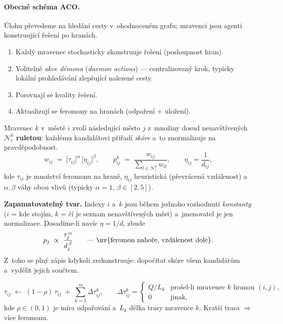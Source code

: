 \documentclass[11pt,a4paper]{article}
\theoremstyle{definition}
\begin{document}
\paragraph{Obecné schéma ACO.} Úlohu převedeme na hledání cesty v~ohodnoceném
grafu; mravenci jsou agenti konstruující řešení po hranách.
\begin{enumerate}
\item Každý mravenec stochasticky zkonstruuje řešení (posloupnost hran).
\item Volitelně \emph{akce démona} (\emph{daemon actions}) --- centralizovaný
  krok, typicky lokální prohledávání zlepšující nalezené cesty.
\item Porovnají se kvality řešení.
\item Aktualizují se feromony na hranách (odpaření + uložení).
\end{enumerate}

\begin{defbox}
Mravenec $k$ v~městě $i$ zvolí následující město $j$ z~množiny dosud
nenavštívených $\mathcal{N}_i^k$ \textbf{ruletou}: každému kandidátovi přiřadí
\emph{skóre} a~to znormalizuje na pravděpodobnost.
\[
w_{ij} \;=\; \big[\tau_{ij}\big]^{\alpha}\,\big[\eta_{ij}\big]^{\beta},
\qquad
p_{ij}^{k} \;=\; \frac{w_{ij}}{\displaystyle\sum_{l \in \mathcal{N}_i^k} w_{il}},
\qquad \eta_{ij} = \frac{1}{d_{ij}},
\]
kde $\tau_{ij}$ je množství feromonu na hraně, $\eta_{ij}$ heuristická
 (převrácená vzdálenost) a~$\alpha, \beta$ váhy obou vlivů
(typicky $\alpha = 1$, $\beta \in [2,5]$).

\textbf{Zapamatovatelný tvar.} Indexy $i$ a~$k$ jsou během jednoho rozhodnutí
\emph{konstanty} ($i$ = kde stojím, $k$ = čí je seznam nenavštívených měst)
a~jmenovatel je jen normalizace. Dosadíme-li navíc $\eta = 1/d$, zbude
\[
p_j \;\propto\; \frac{\tau_j^{\,\alpha}}{d_j^{\,\beta}}
\qquad\text{---\ \uv{feromon nahoře, vzdálenost dole}.}
\]
Z~toho se plný zápis kdykoli zrekonstruuje: dopočítat skóre všem kandidátům
a~vydělit jejich součtem.
\end{defbox}

\begin{defbox}
\[
\tau_{ij} \;\gets\; (1-\rho)\,\tau_{ij} \;+\; \sum_{k=1}^{m} \Delta\tau_{ij}^{k},
\qquad
\Delta\tau_{ij}^{k} =
\begin{cases}
Q/L_k & \text{prošel-li mravenec } k \text{ hranou } (i,j),\\
0 & \text{jinak,}
\end{cases}
\]
kde $\rho \in (0,1)$ je míra odpařování a~$L_k$ délka trasy mravence $k$.
Kratší trasa $\Rightarrow$ více feromonu.
\end{defbox}
\end{document}
